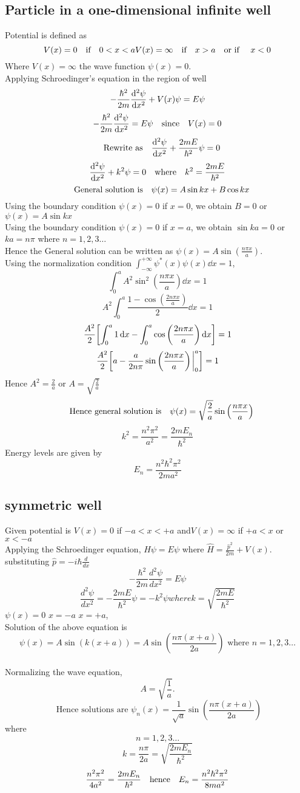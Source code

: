 \documentclass[12pt]{article}
\begin{document}
\subsection*{Particle in a one-dimensional infinite well}
Potential is defined as \[V(x)=0\qq{if} 0<x<a V(x)=\infty \qq{if}x>a \qq{or if }x<0\]
Where $V(x)=\infty$ the wave function $\psi(x) =0$. \\Applying Schroedinger's equation in the region of well \[-\frac{\hbar^2}{2m}\dv[2]{\psi}{x}+V(x)\psi=E\psi\]
\[-\frac{\hbar^2}{2m}\dv[2]{\psi}{x}=E\psi\qq{since} V(x)=0\]
\[\qq{Rewrite as}\dv[2]{\psi}{x}+\frac{2mE}{\hbar^2}\psi=0\]
\[\dv[2]{\psi}{x}+k^2\psi=0\qq{where} k^2=\frac{2mE}{\hbar^2}\]
\[\qq{General solution is}\psi(x)=A\sin{kx}+B\cos{kx}\]
Using the boundary condition $\psi(x)=0$ if $x=0$, we obtain $B=0$
 or $\psi(x)=A\sin{kx}$ \\
Using the boundary condition $\psi(x)=0$ if $x=a$, we obtain $\sin{ka}=0$ or $ka=n\pi$ where $n=1,2,3\ldots$\\
Hence the General solution can be written as $\displaystyle\psi(x)=A\sin{\left(\frac{n\pi x}{a}\right)}$.\\
Using the normalization condition $\displaystyle\int_{-\infty}^{+\infty}\psi^*(x)\psi(x)\dd{x}=1$,\\
\[\displaystyle\int_{0}^{a}A^2\sin^2{\left(\frac{n\pi x}{a}\right)}\dd{x}=1\]
\[\displaystyle A^2\int_{0}^{a}\frac{1-\cos{\left(\frac{2n\pi x}{a}\right)}}{2}\dd{x}=1\]
\[\displaystyle \frac{A^2}{2}\qty[\int_{0}^{a}1\dd{x}-\int_{0}^{a}\cos{\left(\frac{2n\pi x}{a}\right)}\dd{x}]=1\]
\[\displaystyle \frac{A^2}{2}\qty[a-\frac{a}{2n\pi}\sin{\left(\frac{2n\pi x}{a}\right)}\eval_{0}^{a}]=1\]
Hence $\displaystyle A^2=\frac{2}{a}$ or $A=\sqrt{\frac{2}{a}}$\\
\[\qq{Hence general solution is}\psi(x)=\sqrt{\frac{2}{a}}\sin{\left(	\frac{n\pi x}{a}\right)}\]
\[k^2=\frac{n^2\pi^2}{a^2}=\frac{2mE_n}{\hbar^2}\]
Energy levels are given by \[E_n=\frac{n^2\hbar^2\pi^2}{2ma^2}\]
\subsection*{symmetric well}
Given potential is \(V(x)=0\) if    \(-a<x<+a\)
and\(V(x)=\infty\) if \(+a<x\) or \(x<-a\)\\
Applying the Schroedinger equation, $\hat{H}\psi=E\psi$ where
$\hat{H}=\frac{\hat{p}^2}{2m}+V(x)$.\\ substituting $\hat{p}=-i\hbar\frac{d}{dx}$
\[-\frac{\hbar^2}{2m}\frac{d^2\psi}{dx^2}=E\psi\]
\[\frac{d^2\psi}{dx^2}=-\frac{2mE}{\hbar^2}\psi=-k^2\psi where k=\sqrt{\frac{2mE}{\hbar^2}}\]
 $\psi(x)=0$  $x=-a$  $x=+a$,\\
Solution of the above equation is \[\psi(x)=A\sin{\left(k(x+a)\right)}=A\sin{\left(\frac{n\pi(x+a)}{2a}\right)}\text{ where } n=1,2,3\ldots\]\\
Normalizing the wave equation, $$A=\sqrt{\frac{1}{a}}.$$
\[\text{ Hence solutions are }  \psi_{n}(x)=\frac{1}{\sqrt{a}}\sin{\left(\frac{n\pi(x+a)}{2a}\right)}\] where$$ n=1,2,3\ldots$$
$$k=\frac{n\pi}{2a}=\sqrt{\frac{2mE_{n}}{\hbar^2}}$$
\[\frac{n^2\pi^2}{4a^2}=\frac{2mE_{n}}{\hbar^2}\qq{hence} E_{n}=\frac{n^2\hbar^2\pi^2}{8ma^2}\]
\end{document}

